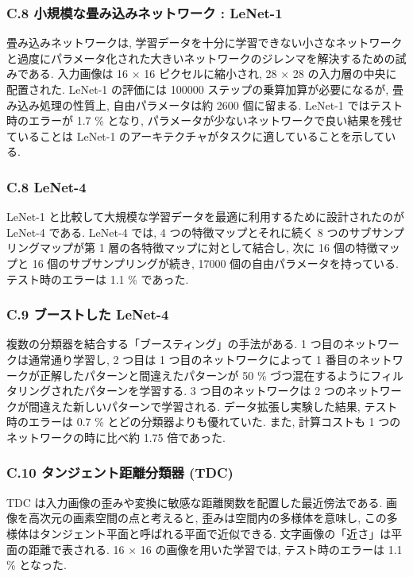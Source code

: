 \documentclass[twocolumn]{jarticle}     %
\begin{document}
\subsubsection*{C.8 小規模な畳み込みネットワーク : LeNet-1}
畳み込みネットワークは, 学習データを十分に学習できない小さなネットワークと過度にパラメータ化された大きいネットワークのジレンマを解決するための試みである.
入力画像は 16 × 16 ピクセルに縮小され, 28 × 28 の入力層の中央に配置された. LeNet-1 の評価には 100000 ステップの乗算加算が必要になるが, 畳み込み処理の性質上, 自由パラメータは約 2600 個に留まる.
LeNet-1 ではテスト時のエラーが 1.7 \% となり, パラメータが少ないネットワークで良い結果を残せていることは LeNet-1 のアーキテクチャがタスクに適していることを示している.

\subsubsection*{C.8 LeNet-4}
LeNet-1 と比較して大規模な学習データを最適に利用するために設計されたのが LeNet-4 である. LeNet-4 では, 4 つの特徴マップとそれに続く 8 つのサブサンプリングマップが第 1 層の各特徴マップに対として結合し, 次に 16 個の特徴マップと 16 個のサブサンプリングが続き, 17000 個の自由パラメータを持っている. テスト時のエラーは 1.1 \% であった.

\subsubsection*{C.9 ブーストした LeNet-4 }
複数の分類器を結合する「ブースティング」の手法がある. 1 つ目のネットワークは通常通り学習し, 2 つ目は 1 つ目のネットワークによって 1 番目のネットワークが正解したパターンと間違えたパターンが 50 \% づつ混在するようにフィルタリングされたパターンを学習する. 3 つ目のネットワークは 2 つのネットワークが間違えた新しいパターンで学習される. データ拡張し実験した結果, テスト時のエラーは 0.7 \% とどの分類器よりも優れていた. また, 計算コストも 1 つのネットワークの時に比べ約 1.75 倍であった.

\subsubsection*{C.10 タンジェント距離分類器 (TDC)}
TDC は入力画像の歪みや変換に敏感な距離関数を配置した最近傍法である. 画像を高次元の画素空間の点と考えると, 歪みは空間内の多様体を意味し, この多様体はタンジェント平面と呼ばれる平面で近似できる. 
文字画像の「近さ」は平面の距離で表される.
16 × 16 の画像を用いた学習では, テスト時のエラーは 1.1 \% となった.
\end{document}
